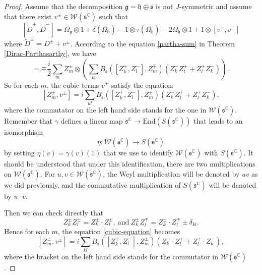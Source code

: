 \documentclass{amsart}[draft,11pt]
\newcommand{\mg}{\mathfrak{g}}
\newcommand{\mh}{\mathfrak{h}}
\newcommand{\ms}{\mathfrak{s}}
\newcommand{\weyl}{\mathcal{W}(\ms^\mathbb{C})}
\numberwithin{equation}{section}
\theoremstyle{definition}
\begin{document}
\begin{proof}

Assume that the decomposition $\mg= \mh \oplus \ms$ is not $J$-symmetric and assume that there exist   $v^\pm \in \weyl$ such that
$$
[\tilde{D}^+,\tilde{D}^-] = 
\Omega_{\mg}\otimes 1 + \delta(\Omega_{\mh})-1\otimes \tau(\Omega_{\mh})- 2\Omega_\mh \otimes 1+ 1\otimes [v^+,v^-]
$$ 
where $\tilde{D}^\pm = D^\pm + v^\pm$.
According to the  equation \eqref{partha-sum} in Theorem \ref{Dirac-Parthasarthy}, we have
\begin{equation*}
[D^\pm,1\otimes v^\mp]=\mp
\frac{i}2\sum_{m}
Z_m^\pm \otimes \left( \sum_{kl} 
B_\ms([Z_k^+,Z_l^-],Z_m^\mp)
(Z_k^-Z_l^+ + Z_l^+Z_k^-) \right)\,.
\end{equation*}
So for each $m$, the cubic terms $v^\pm$  satisfy
the equation:
\begin{equation} 
\label{cubic-equation}  
[Z_m^\pm,v^\pm] =
i\sum_{kl} 
B_\ms([Z_k^+,Z_l^-],Z_m^\pm)
(Z_k^-Z_l^+ + Z_l^+Z_k^-),
\end{equation}
where the commutator on the left hand side stands for the one in $\weyl$.\\ Remember that $\gamma$ defines a linear map $\ms^\mathbb{C} \to \text{End}  (S(\ms^\mathbb{C}))$ that leads to an  
isomorphism 
$$\eta : \weyl \to S(\ms^\mathbb{C})$$ 
by setting $\eta(v)=\gamma(v)(1)$ that we use to identify $\weyl$ with  $S(\ms^\mathbb{C})$.
It should be understood that under this identification, there are two multiplications on $\weyl$.  For $u, v  \in  \weyl $, 
the Weyl multiplication will be denoted by $uv$ as we did previously, and the commutative multiplication of $S(\ms^\mathbb{C})$  will be denoted by $u\cdot v$.

Then we can check directly that 
\begin{equation} 
\label{weyl-sym}  
Z_k^\pm Z_l^\pm=Z_k^\pm \cdot Z_l^\pm, \ \text{and}  \   Z_k^\pm Z_l^\mp=Z_k^\pm \cdot Z_l^\mp \pm \delta_{kl}.
\end{equation} 
Hence for each $m$, the equation  \eqref{cubic-equation} becomes 
\begin{equation} 
\label{cubic-equation-sym}  
[Z_m^\pm,v^\pm] =
i\sum_{kl} 
B_\ms([Z_k^+,Z_l^-],Z_m^\pm)
(Z_k^-\cdot Z_l^+ + Z_l^+\cdot Z_k^-),
\end{equation} 
where the bracket on the left hand side stands for the commutator in $\weyl$.


\end{proof}
\end{document}
